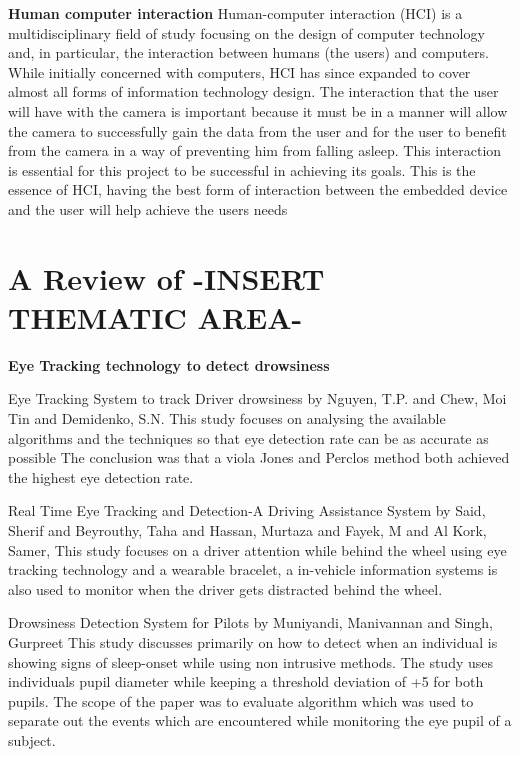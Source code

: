 \textbf{Human computer interaction}
Human-computer interaction (HCI) is a multidisciplinary field of study focusing on the design of computer technology and, in particular, the interaction between humans (the users) and computers. While initially concerned with computers, HCI has since expanded to cover almost all forms of information technology design. The interaction that the user will have with the camera is important because it must be in a manner will allow the camera to successfully gain the data from the user and for the user to benefit from the camera in a way of preventing him from falling asleep. This interaction is essential for this project to be successful in achieving its goals. This is the essence of HCI, having the best form of interaction between the embedded device and the user will help achieve the users needs

\section{A Review of -INSERT THEMATIC AREA-}

  \textbf{Eye Tracking technology to detect drowsiness}
               
Eye Tracking System to track Driver drowsiness by Nguyen, T.P. and Chew, Moi Tin and Demidenko, S.N. \cite{article} This study focuses on analysing the available algorithms and the techniques so that eye detection rate can be as accurate as possible The conclusion was that a viola Jones and Perclos method both achieved the highest eye detection rate. 

Real Time Eye Tracking and Detection-A Driving    Assistance System by Said, Sherif and Beyrouthy, Taha and Hassan, Murtaza and Fayek, M and Al Kork, Samer, \cite{reference2} This study focuses on a driver attention while behind the wheel using eye tracking technology and a wearable bracelet, a in-vehicle  information systems is also used to monitor when the driver gets distracted behind the wheel.

Drowsiness Detection System for Pilots by Muniyandi, Manivannan and Singh, Gurpreet    \cite{inbook} This study discusses primarily on how to detect when an individual is showing signs of sleep-onset while using non intrusive methods. The study uses individuals pupil diameter while keeping a threshold deviation of +5 for both pupils. The scope of the paper was to evaluate algorithm which  was  used to  separate out  the  events which  are encountered  while  monitoring  the  eye pupil  of a  subject.  

